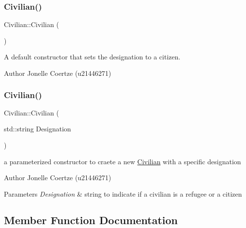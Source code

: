 \subsubsection{\texorpdfstring{Civilian()}{Civilian()}\hspace{0.1cm}{\footnotesize\ttfamily [1/2]}}
{\footnotesize\ttfamily Civilian\+::\+Civilian (\begin{DoxyParamCaption}{ }\end{DoxyParamCaption})}



A default constructor that sets the designation to a citizen. 

\begin{DoxyAuthor}{Author}
Jonelle Coertze (u21446271) 
\end{DoxyAuthor}
\mbox{\label{class_civilian_a783dc80702e3cd2c1254fa44be08fdee}} 
\subsubsection{\texorpdfstring{Civilian()}{Civilian()}\hspace{0.1cm}{\footnotesize\ttfamily [2/2]}}
{\footnotesize\ttfamily Civilian\+::\+Civilian (\begin{DoxyParamCaption}\item[{std\+::string}]{Designation }\end{DoxyParamCaption})}



a parameterized constructor to craete a new \mbox{\hyperlink{class_civilian}{Civilian}} with a specific designation 

\begin{DoxyAuthor}{Author}
Jonelle Coertze (u21446271) 
\end{DoxyAuthor}

\begin{DoxyParams}{Parameters}
{\em Designation} & string to indicate if a civilian is a refugee or a citizen \\
\hline
\end{DoxyParams}


\subsection{Member Function Documentation}
\mbox{\label{class_civilian_a5c7b7c3b4832ba0d6509e8b87fac87e1}} 
